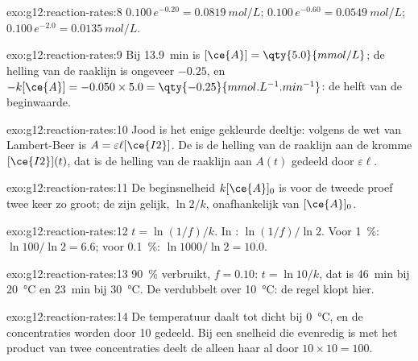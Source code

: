 \begin{solution}{exo:g12:reaction-rates:8}
$0.100\,e^{-0.20} = \qty{0.0819}{mol/L}$; $0.100\,e^{-0.60} =
\qty{0.0549}{mol/L}$; $0.100\,e^{-2.0} = \qty{0.0135}{mol/L}$.
\end{solution}

\begin{solution}{exo:g12:reaction-rates:9}
Bij \qty{13.9}{min} is $[\ce{A}] = \qty{5.0}{mmol/L}$; de helling van de
raaklijn is ongeveer $-0.25$, en $-k[\ce{A}] = -0.050 \times 5.0 =
\qty{-0.25}{mmol.L^{-1}.min^{-1}}$: de helft van de beginwaarde.
\end{solution}

\begin{solution}{exo:g12:reaction-rates:10}
Jood is het enige gekleurde deeltje: volgens de wet van Lambert-Beer is
$A = \varepsilon \ell [\ce{I2}]$. De  is de helling van
de raaklijn aan de kromme $[\ce{I2}](t)$, dat is de helling van de
raaklijn aan $A(t)$ gedeeld door $\varepsilon \ell$.
\end{solution}

\begin{solution}{exo:g12:reaction-rates:11}
De beginsnelheid $k[\ce{A}]_0$ is voor de tweede proef twee keer zo
groot; de  zijn gelijk, $\ln 2 / k$, onafhankelijk van
$[\ce{A}]_0$.
\end{solution}

\begin{solution}{exo:g12:reaction-rates:12}
$t = \ln(1/f)/k$. In : $\ln(1/f)/\ln 2$. Voor
\qty{1}{\percent}: $\ln 100 / \ln 2 = 6.6$; voor \qty{0.1}{\percent}:
$\ln 1000 / \ln 2 =
10.0$.
\end{solution}

\begin{solution}{exo:g12:reaction-rates:13}
\qty{90}{\percent} verbruikt, $f = 0.10$: $t = \ln 10 / k$, dat is
\qty{46}{min} bij \qty{20}{\celsius} en \qty{23}{min} bij
\qty{30}{\celsius}. De  verdubbelt over
\qty{10}{\celsius}: de regel klopt hier.
\end{solution}

\begin{solution}{exo:g12:reaction-rates:14}
De temperatuur daalt tot dicht bij \qty{0}{\celsius}, en de concentraties
worden door 10 gedeeld. Bij een snelheid die evenredig is met het product
van twee concentraties deelt de  alleen haar al door
$10 \times 10 = 100$.
\end{solution}


